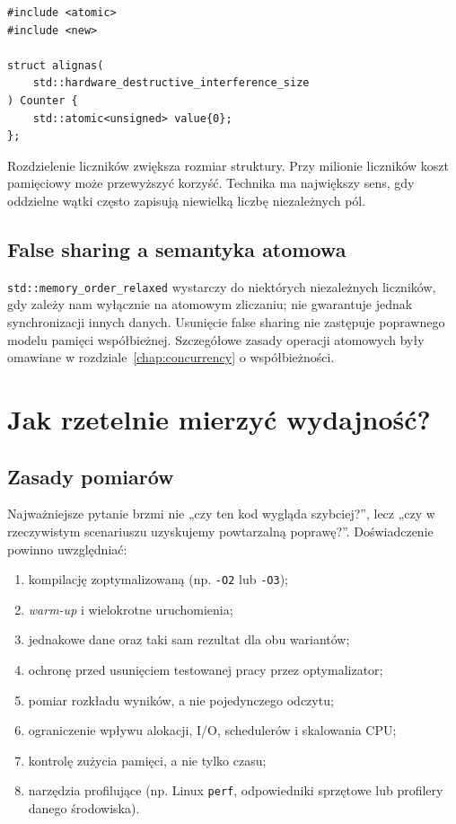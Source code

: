 \begin{lstlisting}
#include <atomic>
#include <new>

struct alignas(
    std::hardware_destructive_interference_size
) Counter {
    std::atomic<unsigned> value{0};
};
\end{lstlisting}

Rozdzielenie liczników zwiększa rozmiar struktury. Przy milionie
liczników koszt pamięciowy może przewyższyć korzyść. Technika ma
największy sens, gdy oddzielne wątki często zapisują niewielką
liczbę niezależnych pól.

\subsection{False sharing a semantyka atomowa}

\texttt{std::memory\_order\_relaxed} wystarczy do niektórych
niezależnych liczników, gdy zależy nam wyłącznie na atomowym
zliczaniu; nie gwarantuje jednak synchronizacji innych danych.
Usunięcie false sharing nie zastępuje poprawnego modelu pamięci
współbieżnej. Szczegółowe zasady operacji atomowych były omawiane
w rozdziale~\ref{chap:concurrency} o współbieżności.

\section{Jak rzetelnie mierzyć wydajność?}
\label{sec:cpp10-benchmark}

\subsection{Zasady pomiarów}

Najważniejsze pytanie brzmi nie „czy ten kod wygląda szybciej?”,
lecz „czy w rzeczywistym scenariuszu uzyskujemy powtarzalną poprawę?”.
Doświadczenie powinno uwzględniać:
\begin{enumerate}
\item kompilację zoptymalizowaną (np. \texttt{-O2} lub \texttt{-O3});
\item \emph{warm-up} i wielokrotne uruchomienia;
\item jednakowe dane oraz taki sam rezultat dla obu wariantów;
\item ochronę przed usunięciem testowanej pracy przez optymalizator;
\item pomiar rozkładu wyników, a nie pojedynczego odczytu;
\item ograniczenie wpływu alokacji, I/O, schedulerów i skalowania CPU;
\item kontrolę zużycia pamięci, a nie tylko czasu;
\item narzędzia profilujące (np. Linux \texttt{perf}, odpowiedniki
      sprzętowe lub profilery danego środowiska).
\end{enumerate}

